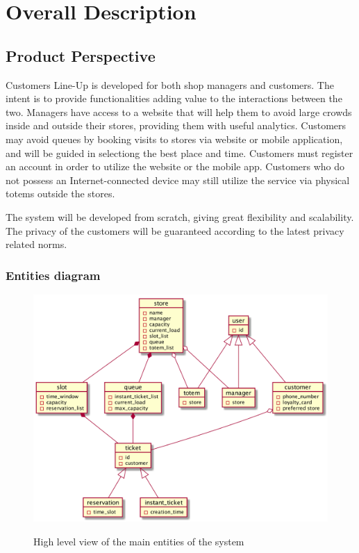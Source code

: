 \section{Overall Description}\label{sec:overall_desc}

\subsection{Product Perspective}

Customers Line-Up is developed for both shop managers and customers.
The intent is to provide functionalities adding value to the interactions between the two.
Managers have access to a website that will help them to avoid large crowds inside and outside their stores, providing them with useful analytics.
Customers may avoid queues by booking visits to stores via website or mobile application, and will be guided in selectiong the best place and time.
Customers must register an account in order to utilize the website or the mobile app.
Customers who do not possess an Internet-connected device may still utilize the service via physical totems outside the stores.

The system will be developed from scratch, giving great flexibility and scalability.
The privacy of the customers will be guaranteed according to the latest privacy related norms.

\subsubsection{Entities diagram}
\begin{figure}[H]
    \centering
    \includegraphics[width=1\textwidth]{uml/high_level_UML.png}
    \label{fig:high_UML}
    \caption{High level view of the main entities of the system}
\end{figure}


